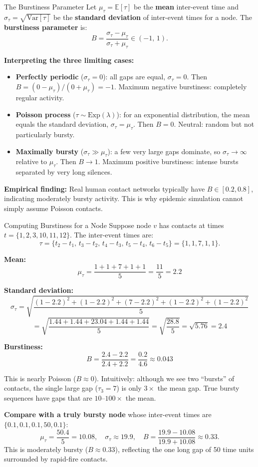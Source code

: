 \begin{mathbox}{The Burstiness Parameter}
Let $\mu_\tau = \mathbb{E}[\tau]$ be the \textbf{mean} inter-event time and $\sigma_\tau =
\sqrt{\mathrm{Var}[\tau]}$ be the \textbf{standard deviation} of inter-event times for a node.
The \textbf{burstiness parameter} is:
\[
  B = \frac{\sigma_\tau - \mu_\tau}{\sigma_\tau + \mu_\tau} \in (-1,\, 1).
\]

\textbf{Interpreting the three limiting cases:}
\begin{itemize}
  \item \textbf{Perfectly periodic} ($\sigma_\tau = 0$): all gaps are equal, $\sigma_\tau = 0$.
        Then $B = (0 - \mu_\tau)/(0 + \mu_\tau) = -1$. Maximum negative burstiness: completely
        regular activity.
  \item \textbf{Poisson process} ($\tau \sim \text{Exp}(\lambda)$): for an exponential
        distribution, the mean equals the standard deviation, $\sigma_\tau = \mu_\tau$. Then
        $B = 0$. Neutral: random but not particularly bursty.
  \item \textbf{Maximally bursty} ($\sigma_\tau \gg \mu_\tau$): a few very large gaps dominate,
        so $\sigma_\tau \to \infty$ relative to $\mu_\tau$. Then $B \to 1$. Maximum positive
        burstiness: intense bursts separated by very long silences.
\end{itemize}

\textbf{Empirical finding:} Real human contact networks typically have $B \in [0.2, 0.8]$,
indicating moderately bursty activity. This is why epidemic simulation cannot simply assume
Poisson contacts.
\end{mathbox}

\begin{examplebox}{Computing Burstiness for a Node}
Suppose node $v$ has contacts at times $t = \{1, 2, 3, 10, 11, 12\}$. The inter-event times
are:
\[
  \tau = \{t_2 - t_1,\, t_3 - t_2,\, t_4 - t_3,\, t_5 - t_4,\, t_6 - t_5\}
       = \{1, 1, 7, 1, 1\}.
\]

\textbf{Mean:}
\[
  \mu_\tau = \frac{1 + 1 + 7 + 1 + 1}{5} = \frac{11}{5} = 2.2
\]

\textbf{Standard deviation:}
\[
  \sigma_\tau = \sqrt{\frac{(1-2.2)^2 + (1-2.2)^2 + (7-2.2)^2 + (1-2.2)^2 + (1-2.2)^2}{5}}
\]
\[
  = \sqrt{\frac{1.44 + 1.44 + 23.04 + 1.44 + 1.44}{5}}
  = \sqrt{\frac{28.8}{5}} = \sqrt{5.76} = 2.4
\]

\textbf{Burstiness:}
\[
  B = \frac{2.4 - 2.2}{2.4 + 2.2} = \frac{0.2}{4.6} \approx 0.043
\]

This is nearly Poisson ($B \approx 0$). Intuitively: although we see two ``bursts'' of
contacts, the single large gap ($\tau_3 = 7$) is only $3\times$ the mean gap. True bursty
sequences have gaps that are $10$--$100\times$ the mean.

\textbf{Compare with a truly bursty node} whose inter-event times are $\{0.1, 0.1, 0.1, 50,
0.1\}$:
\[
  \mu_\tau = \frac{50.4}{5} = 10.08, \quad
  \sigma_\tau \approx 19.9, \quad
  B = \frac{19.9 - 10.08}{19.9 + 10.08} \approx 0.33.
\]
This is moderately bursty ($B \approx 0.33$), reflecting the one long gap of 50 time units
surrounded by rapid-fire contacts.
\end{examplebox}

